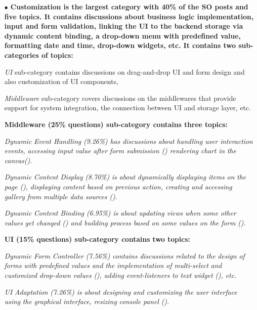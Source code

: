 \nd\bf{$\bullet$ Customization} is the largest category with 40\% of the SO posts and five topics. It contains discussions about business
logic implementation, input and form validation, linking the UI to the backend
storage via dynamic content binding, a drop-down menu with predefined value,
formatting date and time, drop-down widgets, etc. It contains two sub-categories
of topics: \begin{inparaenum}[(1)] \item \textit{UI} sub-category contains discussions
on drag-and-drop UI and form design and also customization of UI components,
\item \textit{Middleware} sub-category covers discussions on the middlewares that
provide support for system integration, the connection between UI and storage layer, etc.
\end{inparaenum}

\bf{{Middleware (25\% questions)}} sub-category contains three topics:
\begin{inparaenum}[(1)] \item \it{Dynamic Event Handling (9.26\%)} has
discussions about handling user interaction events, accessing input
value after form submission () rendering chart in the
canvas().
\item \it{Dynamic Content Display (8.70\%)} is about dynamically displaying
items on the page (), displaying content based on previous action,
creating and accessing gallery from multiple data sources ().
\item \it{Dynamic Content Binding (6.95\%)} is about updating views when some
other values get changed () and building process based on some values
on the form ().
\end{inparaenum} 

\bf{{UI (15\% questions)}} sub-category contains two topics:
\begin{inparaenum}[(1)] \item \it{Dynamic Form Controller (7.56\%)} contains
discussions related to the design of forms with predefined values and the implementation of multi-select and customized drop-down values (), adding event-listeners to text
widget (), etc.
\item \it{UI Adaptation (7.26\%)} is about designing and customizing the user
interface using the graphical interface,
resizing console panel ().
\end{inparaenum} 

